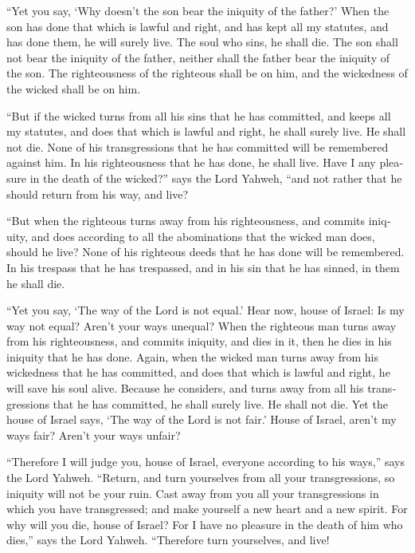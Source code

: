 \begin{paracol}{2}
\begin{otherlanguage}{english}
 ``Yet you say, `Why doesn't the son bear the iniquity of
the father?' When the son has done that which is lawful and right, and
has kept all my statutes, and has done them, he will surely live.
 The soul who sins, he shall die. The son shall not bear
the iniquity of the father, neither shall the father bear the iniquity
of the son. The righteousness of the righteous shall be on him, and the
wickedness of the wicked shall be on him.

 ``But if the wicked turns from all his sins that he has
committed, and keeps all my statutes, and does that which is lawful and
right, he shall surely live. He shall not die.  None of
his transgressions that he has committed will be remembered against him.
In his righteousness that he has done, he shall live. 
Have I any pleasure in the death of the wicked?'' says the Lord Yahweh,
``and not rather that he should return from his way, and live?

 ``But when the righteous turns away from his
righteousness, and commits iniquity, and does according to all the
abominations that the wicked man does, should he live? None of his
righteous deeds that he has done will be remembered. In his trespass
that he has trespassed, and in his sin that he has sinned, in them he
shall die.

 ``Yet you say, `The way of the Lord is not equal.' Hear
now, house of Israel: Is my way not equal? Aren't your ways unequal?
 When the righteous man turns away from his
righteousness, and commits iniquity, and dies in it, then he dies in his
iniquity that he has done.  Again, when the wicked man
turns away from his wickedness that he has committed, and does that
which is lawful and right, he will save his soul alive. 
Because he considers, and turns away from all his transgressions that he
has committed, he shall surely live. He shall not die. 
Yet the house of Israel says, `The way of the Lord is not fair.' House
of Israel, aren't my ways fair? Aren't your ways unfair?

 ``Therefore I will judge you, house of Israel, everyone
according to his ways,'' says the Lord Yahweh. ``Return, and turn
yourselves from all your transgressions, so iniquity will not be your
ruin.  Cast away from you all your transgressions in
which you have transgressed; and make yourself a new heart and a new
spirit. For why will you die, house of Israel?  For I
have no pleasure in the death of him who dies,'' says the Lord Yahweh.
``Therefore turn yourselves, and live!


\end{otherlanguage}
\end{paracol}
